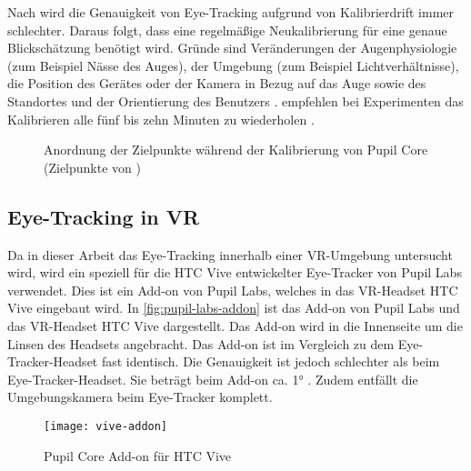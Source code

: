 Nach \citeauthor{Lander.2018} wird die Genauigkeit von Eye-Tracking aufgrund von Kalibrierdrift immer schlechter. Daraus folgt, dass eine regelmäßige Neukalibrierung für eine genaue Blickschätzung benötigt wird. \cite{Lander.2018} Gründe sind Veränderungen der Augenphysiologie (zum Beispiel Nässe des Auges), der Umgebung (zum Beispiel Lichtverhältnisse), die Position des Gerätes oder der Kamera in Bezug auf das Auge sowie des Standortes und der Orientierung des Benutzers \cite{Cerrolaza.2012}. \citeauthor{Clay_Koenig_Koenig_2019} empfehlen bei Experimenten das Kalibrieren alle fünf bis zehn Minuten zu wiederholen \cite{Clay_Koenig_Koenig_2019}. 

\begin{figure}[!htbp]
	\centering
	\caption[Anordnung der Zielpunkte während der Kalibrierung von Pupil Core]{Anordnung der Zielpunkte während der Kalibrierung von Pupil Core (Zielpunkte von \cite{PupilLabsCalibMarker})}
	\label{fig:CalibrationMarker-2D}
\end{figure}

\subsection{Eye-Tracking in VR}
Da in dieser Arbeit das Eye-Tracking innerhalb einer \ac{VR}-Umgebung untersucht wird, wird ein speziell für die HTC Vive entwickelter Eye-Tracker von Pupil Labs verwendet. Dies ist ein Add-on von Pupil Labs, welches in das \ac{VR}-Headset HTC Vive eingebaut wird. In \autoref{fig:pupil-labs-addon} ist das Add-on von Pupil Labs und das \ac{VR}-Headset HTC Vive dargestellt. Das Add-on wird in die Innenseite um die Linsen des Headsets angebracht. Das Add-on ist im Vergleich zu dem Eye-Tracker-Headset fast identisch. Die Genauigkeit ist jedoch schlechter als beim Eye-Tracker-Headset. Sie beträgt beim Add-on ca. 1° \cite{PupilLabsAddOnSpecs}. Zudem entfällt die Umgebungskamera beim Eye-Tracker komplett. 

\begin{figure}[!htbp]
	\centering
	\texttt{[image: vive-addon]}
	\caption[Pupil Core Add-on für HTC Vive]{Pupil Core Add-on für HTC Vive \cite{PupilLabsAddOn}}
	\label{fig:pupil-labs-addon}
\end{figure}


